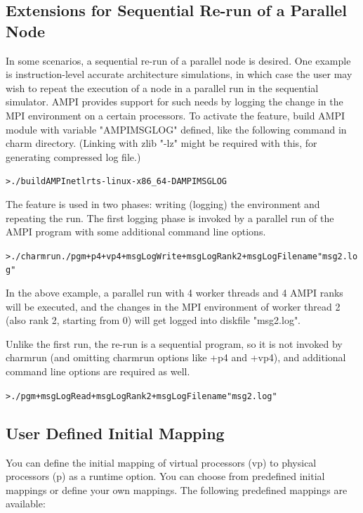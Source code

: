 \documentclass[10pt]{article}
\begin{document}
\subsection{Extensions for Sequential Re-run of a Parallel Node}
In some scenarios, a sequential re-run of a parallel node is desired. One
example is instruction-level accurate architecture simulations, in which case
the user may wish to repeat the execution of a node in a parallel run in the
sequential simulator. AMPI provides support for such needs by logging the change
in the MPI environment on a certain processors. To activate the feature, build
AMPI module with variable "AMPIMSGLOG" defined, like the following command in
charm directory. (Linking with zlib "-lz" might be required with this, for
generating compressed log file.)

\begin{alltt}
> ./build AMPI netlrts-linux-x86_64 -DAMPIMSGLOG
\end{alltt}

The feature is used in two phases: writing (logging) the environment and
repeating the run. The first logging phase is invoked by a parallel run of the
AMPI program with some additional command line options. 

\begin{alltt}
> ./charmrun ./pgm +p4 +vp4 +msgLogWrite +msgLogRank 2 +msgLogFilename "msg2.log"
\end{alltt}

In the above example, a parallel run with 4 worker threads and 4 AMPI ranks will be
executed, and the changes in the MPI environment of worker thread 2 (also rank 2,
starting from 0) will get logged into diskfile "msg2.log". 

Unlike the first run, the re-run is a sequential program, so it is not invoked
by charmrun (and omitting charmrun options like +p4 and +vp4), and additional
command line options are required as well. 

\begin{alltt}
> ./pgm +msgLogRead +msgLogRank 2 +msgLogFilename "msg2.log"
\end{alltt}

\subsection{User Defined Initial Mapping}
                                                                                
You can define the initial mapping of virtual processors (vp) to physical
processors (p) as a runtime option. You can choose from predefined initial
mappings or define your own mappings. The following predefined mappings are
available:
                                                                                
\end{document}
